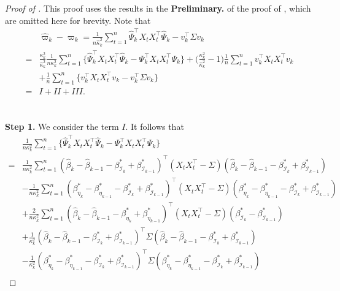 \documentclass[11pt]{article}
\theoremstyle{plain}
\theoremstyle{definition}
\begin{document}
\begin{proof}[Proof of ]
This proof uses the results in the \textbf{Preliminary.} of the proof of , which are omitted here for brevity.  Note that
\begin{align*}
    &\widehat{\varpi}_k - \varpi_k = \frac{1}{n\widehat{\kappa}_k^2}\sum_{t = 1}^n \widehat{\Psi}_k^{\top}X_tX_t^{\top}\widehat{\Psi}_k - v_k^{\top}\Sigma v_k\\
    =& \frac{\kappa_k^2}{\widehat{\kappa}_k^2}\frac{1}{n\kappa_k^2}\sum_{t = 1}^n \big\{\widehat{\Psi}_k^{\top}X_tX_t^{\top}\widehat{\Psi}_k - \Psi_k^{\top}X_tX_t^{\top}\Psi_k\big\} + \bigg(\frac{\kappa_k^2}{\widehat{\kappa}_k^2}-1\bigg)\frac{1}{n}\sum_{t = 1}^n  v_k^{\top}X_tX_t^{\top}v_k\\
    &+ \frac{1}{n}\sum_{t = 1}^n\big\{ v_k^{\top}X_tX_t^{\top}v_k - v_k^{\top}\Sigma v_k\big\}\\
    =& I + II + III.
\end{align*}
\\
\\
\textbf{Step 1.} We consider the term $I$. It follows that
\begin{align*}
    &\frac{1}{n\kappa_k^2}\sum_{t = 1}^n\big\{\widehat{\Psi}_k^{\top}X_tX_t^{\top}\widehat{\Psi}_k - \Psi_k^{\top}X_tX_t^{\top}\Psi_k\big\}\\
    =& \frac{1}{n\kappa_k^2}\sum_{t = 1}^n(\widehat{\beta}_{k} - \widehat{\beta}_{k-1} - \beta_{\mathcal{I}_k}^* + \beta_{\mathcal{I}_{k-1}}^*)^{\top}(X_tX_t^{\top} - \Sigma)(\widehat{\beta}_{k} - \widehat{\beta}_{k-1}- \beta_{\mathcal{I}_k}^* + \beta_{\mathcal{I}_{k-1}}^*)\\
    &- \frac{1}{n\kappa_k^2}\sum_{t = 1}^n(\beta_{\eta_k}^* - \beta_{\eta_{k-1}}^* - \beta_{\mathcal{I}_k}^* + \beta_{\mathcal{I}_{k-1}}^*)^{\top}(X_tX_t^{\top} - \Sigma)(\beta_{\eta_k}^* - \beta_{\eta_{k-1}}^*- \beta_{\mathcal{I}_k}^* + \beta_{\mathcal{I}_{k-1}}^*)\\
    &+ \frac{2}{n\kappa_k^2}\sum_{t = 1}^n(\widehat{\beta}_{k} - \widehat{\beta}_{k-1} - \beta_{\eta_k}^* + \beta_{\eta_{k-1}}^*)^{\top}(X_tX_t^{\top} - \Sigma)( \beta_{\mathcal{I}_k}^* - \beta_{\mathcal{I}_{k-1}}^*)\\
    &+ \frac{1}{\kappa_k^2}(\widehat{\beta}_{k} - \widehat{\beta}_{k-1} - \beta_{\mathcal{I}_k}^* + \beta_{\mathcal{I}_{k-1}}^*)^{\top}\Sigma(\widehat{\beta}_{k} - \widehat{\beta}_{k-1}- \beta_{\mathcal{I}_k}^* + \beta_{\mathcal{I}_{k-1}}^*)\\
    &- \frac{1}{\kappa_k^2}(\beta_{\eta_k}^* - \beta_{\eta_{k-1}}^* - \beta_{\mathcal{I}_k}^* + \beta_{\mathcal{I}_{k-1}}^*)^{\top}\Sigma(\beta_{\eta_k}^* - \beta_{\eta_{k-1}}^*- \beta_{\mathcal{I}_k}^* + \beta_{\mathcal{I}_{k-1}}^*)\\

\end{align*}
\end{proof}
\end{document}
